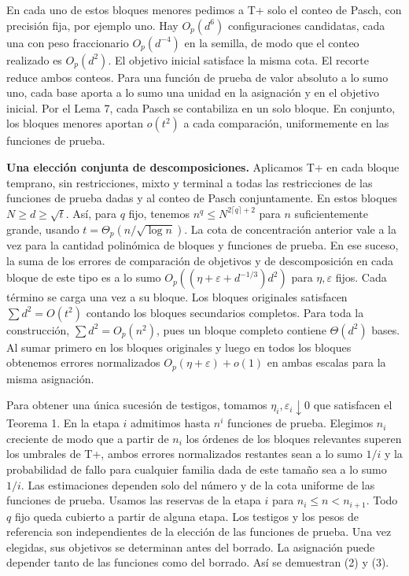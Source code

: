 \documentclass[spanish,11pt,a4paper]{article}
\begin{document}
En cada uno de estos bloques menores pedimos a T+ solo el conteo de Pasch, con precisión fija, por ejemplo uno. Hay \(O_p(d^6)\) configuraciones candidatas, cada una con peso fraccionario \(O_p(d^{-4})\) en la semilla, de modo que el conteo realizado es \(O_p(d^2)\). El objetivo inicial satisface la misma cota. El recorte reduce ambos conteos. Para una función de prueba de valor absoluto a lo sumo uno, cada base aporta a lo sumo una unidad en la asignación y en el objetivo inicial. Por el Lema 7, cada Pasch se contabiliza en un solo bloque. En conjunto, los bloques menores aportan \(o(t^2)\) a cada comparación, uniformemente en las funciones de prueba.

\textbf{Una elección conjunta de descomposiciones.} Aplicamos T+ en cada bloque temprano, sin restricciones, mixto y terminal a todas las restricciones de las funciones de prueba dadas y al conteo de Pasch conjuntamente. En estos bloques \(N\ge d\ge\sqrt t\). Así, para \(q\) fijo, tenemos \(n^q\le N^{2\lceil q\rceil+2}\) para \(n\) suficientemente grande, usando \(t=\Theta_p(n/\sqrt{\log n})\). La cota de concentración anterior vale a la vez para la cantidad polinómica de bloques y funciones de prueba. En ese suceso, la suma de los errores de comparación de objetivos y de descomposición en cada bloque de este tipo es a lo sumo \(O_p((\eta+\varepsilon+d^{-1/3})d^2)\) para \(\eta,\varepsilon\) fijos. Cada término se carga una vez a su bloque. Los bloques originales satisfacen \(\sum d^2=O(t^2)\) contando los bloques secundarios completos. Para toda la construcción, \(\sum d^2=O_p(n^2)\), pues un bloque completo contiene \(\Theta(d^2)\) bases. Al sumar primero en los bloques originales y luego en todos los bloques obtenemos errores normalizados \(O_p(\eta+\varepsilon)+o(1)\) en ambas escalas para la misma asignación.

Para obtener una única sucesión de testigos, tomamos \(\eta_i,\varepsilon_i\downarrow0\) que satisfacen el Teorema 1. En la etapa \(i\) admitimos hasta \(n^i\) funciones de prueba. Elegimos \(n_i\) creciente de modo que a partir de \(n_i\) los órdenes de los bloques relevantes superen los umbrales de T+, ambos errores normalizados restantes sean a lo sumo \(1/i\) y la probabilidad de fallo para cualquier familia dada de este tamaño sea a lo sumo \(1/i\). Las estimaciones dependen solo del número y de la cota uniforme de las funciones de prueba. Usamos las reservas de la etapa \(i\) para \(n_i\le n<n_{i+1}\). Todo \(q\) fijo queda cubierto a partir de alguna etapa. Los testigos y los pesos de referencia son independientes de la elección de las funciones de prueba. Una vez elegidas, sus objetivos se determinan antes del borrado. La asignación puede depender tanto de las funciones como del borrado. Así se demuestran (2) y (3).
\end{document}
